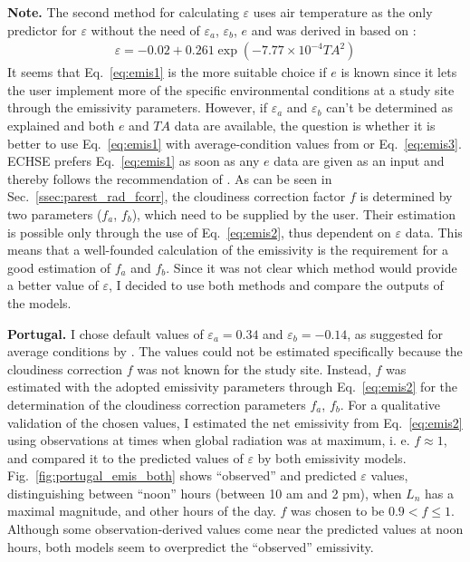 \documentclass{scrreprt}
\begin{document}
\textbf{Note.}
The second method for calculating $\varepsilon$ uses air temperature as the only predictor for $\varepsilon$ without the need of $\varepsilon_a$, $\varepsilon_b$, $e$ and was derived in \citet{maidment93} based on \citet{idso69}:
\begin{align} \label{eq:emis3}
  \varepsilon = -0.02 + 0.261 \exp(-7.77 \times 10^{-4} TA^2)
\end{align}
%
It seems that Eq.~\eqref{eq:emis1} is the more suitable choice if $e$ is known since it lets the user implement more of the specific environmental conditions at a study site through the emissivity parameters.
However, if $\varepsilon_a$ and $\varepsilon_b$ can't be determined as explained and both $e$ and $TA$ data are available, the question is whether it is better to use Eq.~\eqref{eq:emis1} with average-condition values from \citet{maidment93} or Eq.~\eqref{eq:emis3}.
ECHSE prefers Eq.~\eqref{eq:emis1} as soon as any $e$ data are given as an input and thereby follows the recommendation of \citet{maidment93}.
As can be seen in Sec.~\ref{ssec:parest_rad_fcorr}, the cloudiness correction factor $f$ is determined by two parameters ($f_a$, $f_b$), which need to be supplied by the user.
Their estimation is possible only through the use of Eq.~\eqref{eq:emis2}, thus dependent on $\varepsilon$ data.
This means that a well-founded calculation of the emissivity is the requirement for a good estimation of $f_a$ and $f_b$.
Since it was not clear which method would provide a better value of $\varepsilon$, I decided to use both methods and compare the outputs of the models.

\textbf{Portugal.}
I chose default values of $\varepsilon_a = 0.34$ and $\varepsilon_b = -0.14$, as suggested for average conditions by \citet{maidment93}.
The values could not be estimated specifically because the cloudiness correction $f$ was not known for the study site.
Instead, $f$ was estimated with the adopted emissivity parameters through Eq.~\eqref{eq:emis2} for the determination of the cloudiness correction parameters $f_a$, $f_b$.
For a qualitative validation of the chosen values, I estimated the net emissivity from Eq.~\eqref{eq:emis2} using observations at times when global radiation was at maximum, i. e. $f \approx 1$, and compared it to the predicted values of $\varepsilon$ by both emissivity models.
Fig.~\ref{fig:portugal_emis_both} shows ``observed'' and predicted $\varepsilon$ values, distinguishing between ``noon'' hours (between 10 am and 2 pm), when $L_n$ has a maximal magnitude, and other hours of the day.
$f$ was chosen to be $0.9 < f \leq 1$.
Although some observation-derived values come near the predicted values at noon hours, both models seem to overpredict the ``observed'' emissivity.
\end{document}
